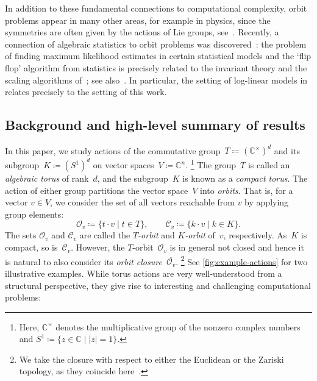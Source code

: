 \documentclass[10pt,a4paper]{article}
\theoremstyle{definition}
\newcommand{\CC}{\mathbb{C}}
\newcommand{\OO}{\ensuremath{\mathcal{O}}}
\newcommand{\KK}{\ensuremath{\mathcal{C}}}
\numberwithin{equation}{section}
\begin{document}
In addition to these fundamental connections to computational complexity, orbit problems appear in many other areas,
for example in physics, since the symmetries are often given by the actions of Lie groups,
see~\cite{audin2012torus, marsdenweinstein, symplectic-in-physics}.
Recently, a connection of algebraic statistics to orbit problems was discovered~\cite{AKRS:21b,amendola2021toric}:
the problem of finding maximum likelihood estimates in certain statistical models and the `flip flop' algorithm from
statistics is precisely related to the invariant theory and the scaling algorithms of~\cite{GGOW16,BGOWW}; see also~\cite{franks2021near,derksen2021maximum,derksen2022maximum}.
In particular, the setting of log-linear models in~\cite{amendola2021toric} relates precisely to the setting of this work.

\subsection{Background and high-level summary of results}\label{subsec:orbit problems}
In this paper, we study actions of the commutative group~$T\coloneqq(\CC^\times)^d$ and its subgroup~$K\coloneqq(S^1)^d$
on vector spaces~$V \coloneqq \CC^n$.%
\footnote{Here, $\CC^\times$ denotes the multiplicative group of the nonzero complex numbers and $S^1\coloneqq\{ z\in\CC\mid |z|=1 \}$.}
The group~$T$ is called an \emph{algebraic torus} of rank~$d$, and the subgroup~$K$ is known as a \emph{compact torus}.
The action of either group partitions the vector space~$V$ into \emph{orbits}.
That is, for a vector $v\in V$, we consider the set of all vectors reachable from $v$ by applying group elements:
\[
  \OO_v\coloneqq \{t\cdot v\mid t\in T\}, \qquad \KK_v \coloneqq \{ k\cdot v\mid k\in K \} .
\]
The sets $\OO_v$ and $\KK_v$ are called the \textit{$T$-orbit} and \textit{$K$-orbit} of~$v$, respectively.
As~$K$ is compact, so is~$\KK_v$.
However, the $T$-orbit~$\OO_v$ is in general not closed and hence it is natural to also consider its \emph{orbit closure}~$\overline{\OO_v}$.%
\footnote{We take the closure with respect to either the Euclidean or the Zariski topology, as they coincide here~\cite[I\ \S10]{mumford:red}.}
See \cref{fig:example-actions} for two illustrative examples.
%
While torus actions are very well-understood from a structural perspective, they give rise to interesting and challenging computational problems:
\end{document}
